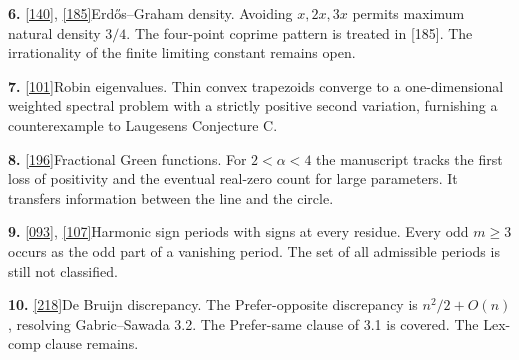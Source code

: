 \documentclass[11pt]{article}
\begin{document}
\noindent\textbf{6.} \href{https://github.com/QEEDDD/Verifiable-Mathematical-Reasoning-Corpus/blob/c2ac34ea4622778187173f41bb1996deee8081b7/\%5B140\%5D\%20ErdosGraham_Density_Parity_Packings.tex}{[140]}, \href{https://github.com/QEEDDD/Verifiable-Mathematical-Reasoning-Corpus/blob/c2ac34ea4622778187173f41bb1996deee8081b7/\%5B185\%5D\%20three_proof_transfers_unified.tex}{[185]}\quad Erd\H{o}s--Graham density. Avoiding $x,2x,3x$ permits maximum natural density $3/4$. The four-point coprime pattern is treated in [185]. The irrationality of the finite limiting constant remains open.

\noindent\textbf{7.} \href{https://github.com/QEEDDD/Verifiable-Mathematical-Reasoning-Corpus/blob/c2ac34ea4622778187173f41bb1996deee8081b7/\%5B101\%5D\%20robin_convex_domain_nonconcavity.tex}{[101]}\quad Robin eigenvalues. Thin convex trapezoids converge to a one-dimensional weighted spectral problem with a strictly positive second variation, furnishing a counterexample to Laugesen\textquotesingle s Conjecture C.

\noindent\textbf{8.} \href{https://github.com/QEEDDD/Verifiable-Mathematical-Reasoning-Corpus/blob/c2ac34ea4622778187173f41bb1996deee8081b7/\%5B196\%5D\%20fractional_green_zeros.tex}{[196]}\quad Fractional Green functions. For $2<\alpha<4$ the manuscript tracks the first loss of positivity and the eventual real-zero count for large parameters. It transfers information between the line and the circle.

\noindent\textbf{9.} \href{https://github.com/QEEDDD/Verifiable-Mathematical-Reasoning-Corpus/blob/c2ac34ea4622778187173f41bb1996deee8081b7/\%5B093\%5D\%20pm1_vanishing_paper.tex}{[093]}, \href{https://github.com/QEEDDD/Verifiable-Mathematical-Reasoning-Corpus/blob/c2ac34ea4622778187173f41bb1996deee8081b7/\%5B107\%5D\%20Dyadic_Saturation_and_Companion_Results_2026_11_02.tex}{[107]}\quad Harmonic sign periods with signs at every residue. Every odd $m\ge3$ occurs as the odd part of a vanishing period. The set of all admissible periods is still not classified.

\noindent\textbf{10.} \href{https://github.com/QEEDDD/Verifiable-Mathematical-Reasoning-Corpus/blob/c2ac34ea4622778187173f41bb1996deee8081b7/\%5B218\%5D\%20De_Bruijn_Discrepancy_Complete.tex}{[218]}\quad De Bruijn discrepancy. The Prefer-opposite discrepancy is $n^2/2+O(n)$, resolving Gabric--Sawada 3.2. The Prefer-same clause of 3.1 is covered. The Lex-comp clause remains.
\end{document}
